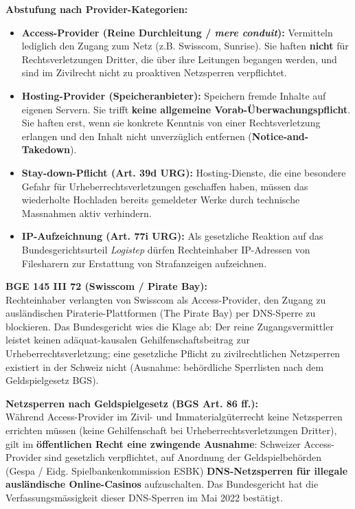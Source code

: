 \begin{theorem}
    \textbf{Abstufung nach Provider-Kategorien:}
    \begin{itemize}
        \item \textbf{Access-Provider (Reine Durchleitung / \textit{mere conduit}):} Vermitteln lediglich den Zugang zum Netz (z.B. Swisscom, Sunrise). Sie haften \textbf{nicht} für Rechtsverletzungen Dritter, die über ihre Leitungen begangen werden, und sind im Zivilrecht nicht zu proaktiven Netzsperren verpflichtet.
        \item \textbf{Hosting-Provider (Speicheranbieter):} Speichern fremde Inhalte auf eigenen Servern. Sie trifft \textbf{keine allgemeine Vorab-Überwachungspflicht}. Sie haften erst, wenn sie konkrete Kenntnis von einer Rechtsverletzung erlangen und den Inhalt nicht unverzüglich entfernen (\textbf{Notice-and-Takedown}).
        \item \textbf{Stay-down-Pflicht (Art. 39d URG):} Hosting-Dienste, die eine besondere Gefahr für Urheberrechtsverletzungen geschaffen haben, müssen das wiederholte Hochladen bereits gemeldeter Werke durch technische Massnahmen aktiv verhindern.
        \item \textbf{IP-Aufzeichnung (Art. 77i URG):} Als gesetzliche Reaktion auf das Bundesgerichtsurteil \textit{Logistep} dürfen Rechteinhaber IP-Adressen von Filesharern zur Erstattung von Strafanzeigen aufzeichnen.
    \end{itemize}
\end{theorem}

\begin{example}
    \textbf{BGE 145 III 72 (Swisscom / Pirate Bay):} \\
    Rechteinhaber verlangten von Swisscom als Access-Provider, den Zugang zu ausländischen Piraterie-Plattformen (The Pirate Bay) per DNS-Sperre zu blockieren. Das Bundesgericht wies die Klage ab: Der reine Zugangsvermittler leistet keinen adäquat-kausalen Gehilfenschaftsbeitrag zur Urheberrechtsverletzung; eine gesetzliche Pflicht zu zivilrechtlichen Netzsperren existiert in der Schweiz nicht (Ausnahme: behördliche Sperrlisten nach dem Geldspielgesetz BGS).
\end{example}

\begin{remark}
    \textbf{Netzsperren nach Geldspielgesetz (BGS Art. 86 ff.):} \\
    Während Access-Provider im Zivil- und Immaterialgüterrecht keine Netzsperren errichten müssen (keine Gehilfenschaft bei Urheberrechtsverletzungen Dritter), gilt im \textbf{öffentlichen Recht eine zwingende Ausnahme}: Schweizer Access-Provider sind gesetzlich verpflichtet, auf Anordnung der Geldspielbehörden (Gespa / Eidg. Spielbankenkommission ESBK) \textbf{DNS-Netzsperren für illegale ausländische Online-Casinos} aufzuschalten. Das Bundesgericht hat die Verfassungsmässigkeit dieser DNS-Sperren im Mai 2022 bestätigt.
\end{remark}

